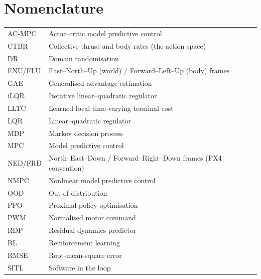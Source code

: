 \documentclass[11pt,a4paper,twoside,openright]{report}
\makeatletter
\renewcommand{\subsection}{\FloatBarrier\old@subsection}}
\DeclareRobustCommand{\ACMPC}{AC\nbd MPC}
\theoremstyle{plain}
\theoremstyle{definition}
\theoremstyle{remark}
\DeclareRobustCommand{\nbd}{\mbox{-}}
\makeatother
\begin{document}
	\cleardoublepage

	\tableofcontents
	\cleardoublepage
	\listoffigures
	\cleardoublepage
	\listoftables
	\cleardoublepage

	\chapter*{Nomenclature}

	\vspace{-3mm}
	\subsection*{Acronyms}
	\begin{longtable}{@{}p{26mm}p{112mm}@{}}
		\toprule
		\ACMPC  & Actor--critic model predictive control \\
		CTBR    & Collective thrust and body rates (the action space) \\
		DR      & Domain randomisation \\
		ENU/FLU & East--North--Up (world) / Forward--Left--Up (body) frames \\
		GAE     & Generalised advantage estimation \\
		iLQR    & Iterative linear--quadratic regulator \\
		LLTC    & Learned local time-varying terminal cost \\
		LQR     & Linear--quadratic regulator \\
		MDP     & Markov decision process \\
		MPC     & Model predictive control \\
		NED/FRD & North--East--Down / Forward--Right--Down frames (PX4 convention) \\
		NMPC    & Nonlinear model predictive control \\
		OOD     & Out of distribution \\
		PPO     & Proximal policy optimisation \\
		PWM     & Normalised motor command \\
		RDP     & Residual dynamics predictor \\
		RL      & Reinforcement learning \\
		RMSE    & Root-mean-square error \\
		SITL    & Software in the loop \\
		\bottomrule
	\end{longtable}
\end{document}
